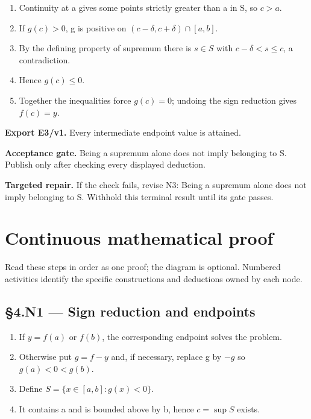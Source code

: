 \documentclass[preprint,12pt,aps,pra,showkeys,amsmath,amssymb,superscriptaddress,floatfix]{revtex4-2}
\theoremstyle{definition}
\theoremstyle{remark}
\newcommand{\field}[2]{\par\smallskip\noindent\textbf{#1.} #2\par}
\begin{document}
\begin{enumerate}[label=N3.\arabic*,leftmargin=3.4em]

\item Continuity at a gives some points strictly greater than a in S, so
\(c>a\).

\item If \(g(c)>0\), g is positive on \((c-\delta ,c+\delta )\cap [a,b]\).

\item By the defining property of supremum there is \(s\in S\) with
\(c-\delta <s\le c\), a contradiction.

\item Hence \(g(c)\le 0\).

\item Together the inequalities force \(g(c)=0\); undoing the sign reduction
gives \(f(c)=y\).

\end{enumerate}

\field{Export E3/v1}{Every intermediate endpoint value is attained.}

\field{Acceptance gate}{Being a supremum alone does not imply belonging to S. Publish only after
checking every displayed deduction.}

\field{Targeted repair}{If the check fails, revise N3: Being a supremum alone does not imply
belonging to S. Withhold this terminal result until its gate passes.}

\endgroup\clearpage\section{Continuous mathematical proof}\label{sec:proof}

Read these steps in order as one proof; the diagram is optional.
Numbered activities identify the specific constructions and deductions
owned by each node.

\subsection{§4.N1 --- Sign reduction and
endpoints}\label{n1-sign-reduction-and-endpoints}

\begin{enumerate}
\def\labelenumi{\arabic{enumi}.}
\item
  If \(y=f(a)\) or \(f(b)\), the corresponding endpoint solves the
  problem.
\item
  Otherwise put \(g=f-y\) and, if necessary, replace g by \(-g\) so
  \(g(a)<0<g(b)\).
\item
  Define \(S=\{x\in [a,b]:g(x)<0\}\).
\item
  It contains a and is bounded above by b, hence
  \(c=\operatorname{sup} S\) exists.
\end{enumerate}
\end{document}
